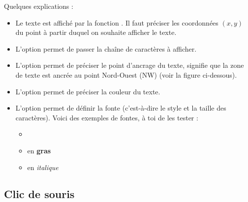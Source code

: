 \documentclass[11pt,class=report,crop=false]{standalone}
\begin{document}
Quelques explications :
\begin{itemize}
%  
  
  \item Le texte est affiché par la fonction . Il faut préciser les coordonnées $(x,y)$ du point à partir duquel on souhaite afficher le texte. 
  
  \item L'option  permet de passer la chaîne de caractères à afficher.
  
  \item L'option  permet de préciser le point d'ancrage du texte,  signifie que la zone de texte est ancrée au point Nord-Ouest (NW) (voir la figure ci-dessous).
  
  \item L'option  permet de préciser la couleur du texte.
  
  \item L'option  permet de définir la fonte (c'est-à-dire le style et la taille des caractères). Voici des exemples de fontes, à toi de les tester :
  \begin{itemize}
    \item {} 
    \item {} en \textbf{gras}
    \item {} en \emph{italique}
  \end{itemize}  
\end{itemize}



\subsection{Clic de souris}
\end{document}
